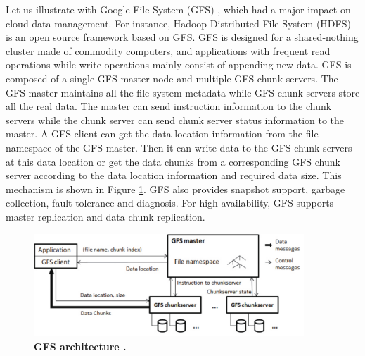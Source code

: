 Let us illustrate with Google File System (GFS) \cite{Ghemawat2003},
which had a major impact on cloud data management.
For instance, Hadoop Distributed File System (HDFS) is an open source framework
based on GFS.
GFS is designed for a shared-nothing cluster made of commodity
computers, and applications with frequent read operations while
write operations mainly consist of appending new data. 
GFS is composed of a single GFS master node and multiple GFS chunk servers.
The GFS master maintains all the file system metadata while GFS chunk servers
store all the real data. The master can send instruction information to the chunk servers while the chunk server can send chunk server status information to the master. A GFS client can get
the data location information from the file namespace of the GFS master. Then it can write data to the GFS chunk servers at this data location or get the data chunks 
from a corresponding GFS chunk server according to the data location information and required data size. 
This mechanism is shown in Figure \ref{fig:f14}. GFS also provides
snapshot support,
garbage collection, fault-tolerance and diagnosis. For
high availability,  GFS supports master replication and data chunk replication.

\begin{figure}
\begin{centering}
\includegraphics[width=4in]{figures/f14}
\par\end{centering}

\caption{\textbf{GFS architecture \cite{Ghemawat2003}. }}
\label{fig:f14} 
\end{figure}


